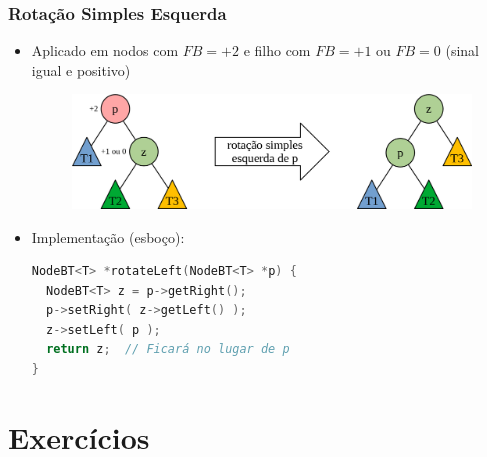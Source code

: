 \documentclass[aspectratio=169]{beamer}
\begin{document}
\begin{frame}[fragile]\frametitle{Rotação Simples Esquerda}
\begin{itemize}
	\item Aplicado em nodos com $FB = +2$ e filho com $FB = +1$ ou $FB = 0$ (sinal igual e positivo)
\begin{figure}[h]
	\centering
	\includegraphics[height=0.3\paperheight]{imagens/rot_sim_esq.png}
\end{figure}
	\item Implementação (esboço):
\begin{lstlisting}[language=C++,basicstyle=\ttfamily\scriptsize]
NodeBT<T> *rotateLeft(NodeBT<T> *p) {
  NodeBT<T> z = p->getRight();
  p->setRight( z->getLeft() );
  z->setLeft( p );
  return z;  // Ficará no lugar de p
}
\end{lstlisting}
\end{itemize}
\end{frame}

\section{Exercícios}
\end{document}
